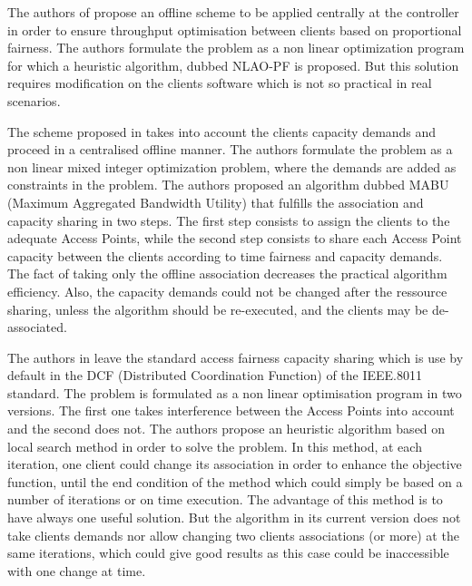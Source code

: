 \documentclass[journal,transmag]{IEEEtran}
\begin{document}
The authors of \cite{14AP_association_multirate_WLAN} propose an offline scheme to be applied centrally at the controller in order to ensure throughput optimisation between clients based on proportional fairness. The authors formulate the problem as a non linear optimization program for which a heuristic algorithm, dubbed NLAO-PF is proposed. But this solution requires modification on the clients software which is not so practical in real scenarios. 

The scheme proposed in \cite{16throughput_optimisation_association_bandwidth} takes into account the clients capacity demands and proceed in a centralised offline manner. The authors formulate the problem as a non linear mixed integer optimization problem, where the demands are added as constraints in the problem. The authors proposed an algorithm dubbed MABU (Maximum Aggregated Bandwidth Utility) that fulfills the association and capacity sharing in two steps. The first step consists to assign the clients to the adequate Access Points, while the second step consists to share each Access Point capacity between the clients according to time fairness and capacity demands. The fact of taking only the offline association decreases the practical algorithm efficiency. Also, the capacity demands could not be changed after the ressource sharing, unless the algorithm should be re-executed, and the clients may be de-associated. 


The authors in \cite{16AP_association_optimisation_fairness} leave the standard access fairness capacity sharing which is use by default in the DCF (Distributed Coordination Function) of the IEEE.8011 standard. The problem is formulated as a non linear optimisation program in two versions. The first one takes interference between the Access Points into account and the second does not. The authors propose an heuristic algorithm based on local search method in order to solve the problem. In this method, at each iteration, one client could change its association in order to enhance the objective function, until the end condition of the method which could simply be based on a number of iterations or on time execution. The advantage of this method is to have always one useful solution. But the algorithm in its current version does not take clients demands nor allow changing two clients associations (or more) at the same iterations, which could give good results as this case could be inaccessible with one change at time.      
\end{document}
